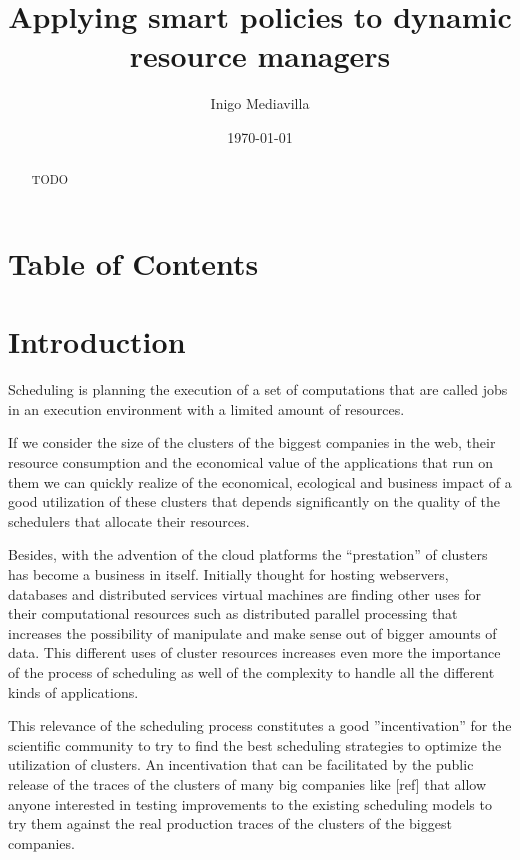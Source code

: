 \documentclass{svjour3}                     %
\begin{document}
\title{ Applying smart policies to dynamic resource managers }


\author{ Inigo Mediavilla }

\date{\today}

\maketitle

\begin{abstract}
TODO
\end{abstract}

\section{Table of Contents}

\tableofcontents

\section{Introduction}

Scheduling is planning the execution of a set of computations that
are called jobs in an execution environment with a limited amount of
resources.

If we consider the size of the clusters of the biggest companies
in the web, their resource consumption and the economical value of the
applications that run on them we can quickly realize of the
economical, ecological and business impact of a good utilization of
these clusters that depends significantly on the quality of
the schedulers that allocate their resources.

Besides, with the advention of the cloud platforms the ``prestation'' of clusters
has become a business in itself. Initially thought for hosting
webservers, databases and distributed services virtual machines
are finding other uses for their computational resources such as
distributed parallel processing that increases the possibility
of manipulate and make sense out of bigger amounts of data. This
different uses of cluster resources increases
even more the importance of the process of scheduling as well of the
complexity to handle all the different kinds of applications.

This relevance of the scheduling process constitutes a good
''incentivation'' for the scientific community to try to find the best
scheduling strategies to optimize the utilization of clusters. An
incentivation that can be facilitated by the public release of the
traces of the clusters of many big companies like [ref] that allow
anyone interested in testing improvements to the existing scheduling
models to try them against the real production traces of the clusters
of the biggest companies.
\end{document}
